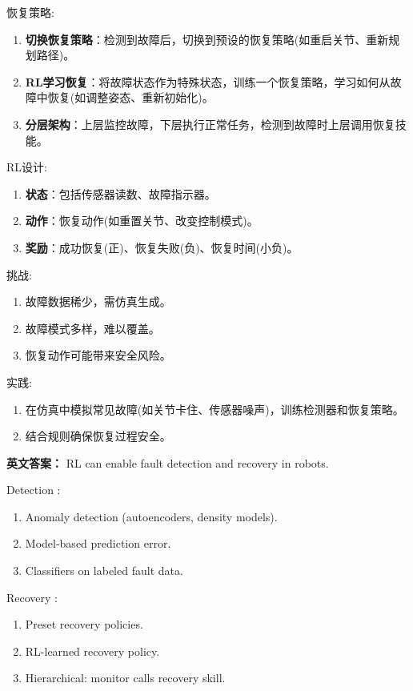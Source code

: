 \documentclass[10pt,a4paper]{ctexart}
\begin{document}
 恢复策略:
\begin{enumerate}
    \item \textbf{切换恢复策略}：检测到故障后，切换到预设的恢复策略(如重启关节、重新规划路径)。
    \item \textbf{RL学习恢复}：将故障状态作为特殊状态，训练一个恢复策略，学习如何从故障中恢复(如调整姿态、重新初始化)。
    \item \textbf{分层架构}：上层监控故障，下层执行正常任务，检测到故障时上层调用恢复技能。
\end{enumerate}

 RL设计:
\begin{enumerate}
    \item \textbf{状态}：包括传感器读数、故障指示器。
    \item \textbf{动作}：恢复动作(如重置关节、改变控制模式)。
    \item \textbf{奖励}：成功恢复(正)、恢复失败(负)、恢复时间(小负)。
\end{enumerate}

 挑战:
\begin{enumerate}
    \item 故障数据稀少，需仿真生成。
    \item 故障模式多样，难以覆盖。
    \item 恢复动作可能带来安全风险。
\end{enumerate}

 实践:
\begin{enumerate}
    \item 在仿真中模拟常见故障(如关节卡住、传感器噪声)，训练检测器和恢复策略。
    \item 结合规则确保恢复过程安全。
\end{enumerate}

\textbf{英文答案：}  
RL can enable fault detection and recovery in robots.

 Detection :
\begin{enumerate}
    \item Anomaly detection (autoencoders, density models).
    \item Model-based prediction error.
    \item Classifiers on labeled fault data.
\end{enumerate}

 Recovery :
\begin{enumerate}
    \item Preset recovery policies.
    \item RL-learned recovery policy.
    \item Hierarchical: monitor calls recovery skill.
\end{enumerate}
\end{document}

